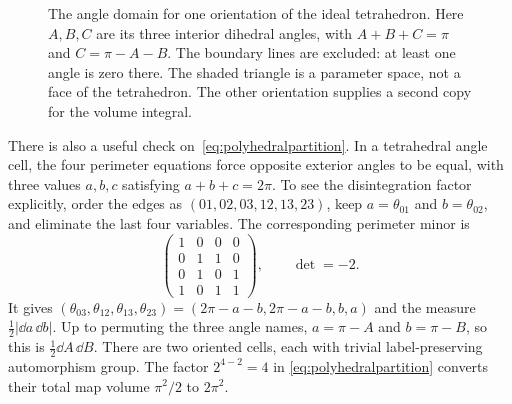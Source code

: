 \begin{figure}[htbp]
\centering
{}
\caption*{The angle domain for one orientation of the ideal tetrahedron.
Here $A,B,C$ are its three interior dihedral angles, with
$A+B+C=\pi$ and $C=\pi-A-B$.
The boundary lines are excluded: at least one angle is zero there.
The shaded triangle is a parameter space, not a face of the tetrahedron.
The other orientation supplies a second copy for the volume integral.}
\end{figure}

There is also a useful check on~\eqref{eq:polyhedralpartition}. In a
tetrahedral angle cell, the four perimeter equations force opposite exterior
angles to be equal, with three values $a,b,c$ satisfying $a+b+c=2\pi$.
To see the disintegration factor explicitly, order the edges as
$(01,02,03,12,13,23)$, keep $a=\theta_{01}$ and $b=\theta_{02}$,
and eliminate the last four variables. The corresponding perimeter minor is
\[
 \begin{pmatrix}
 1&0&0&0\\0&1&1&0\\0&1&0&1\\1&0&1&1
 \end{pmatrix},\qquad \det=-2.
\]
It gives $(\theta_{03},\theta_{12},\theta_{13},\theta_{23})
=(2\pi-a-b,2\pi-a-b,b,a)$ and the measure
$\frac12|\dd a\,\dd b|$. Up to permuting the three angle names,
$a=\pi-A$ and $b=\pi-B$, so this is
$\frac12\dd A\,\dd B$. There are two oriented cells, each with trivial
label-preserving automorphism group. The factor $2^{4-2}=4$ in
\eqref{eq:polyhedralpartition} converts their total map volume $\pi^2/2$
to $2\pi^2$.

